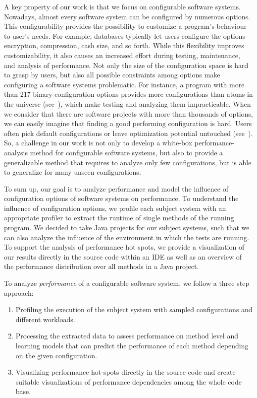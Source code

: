 A key property of our work is that we focus on configurable software systems. 
Nowadays, almost every software system can be configured by numerous options. 
This configurability provides the possibility to customize a program's behaviour to user's needs. 
For example, databases typically let users configure the options encryption, compression, cash size, and so forth. 
While this flexibility improves customizability, it also causes an increased effort during testing, maintenance, and analysis of performance. 
Not only the size of the configuration space is hard to grasp by users, but also all possible constraints among options make configuring a software systems problematic.
For instance, a program with more than 217 binary configuration options provides more configurations than atoms in the universe (see~\cite{krueger2006new}), which make testing and analyzing them impracticable. 
When we consider that there are software projects with more than thousands of options, we can easily imagine that finding a good performing configuration is hard.
Users often pick default configurations or leave optimization potential untouched (see~\cite{xu2015hey}).
So, a challenge in our work is not only to develop a white-box performance-analysis method for configurable software systems, but also to provide a generalizable method that requires to analyze only few configurations, but is able to generalize for many unseen configurations.

To sum up, our goal is to analyze performance and model the influence of configuration options of software systems on performance. 
To understand the influence of configuration options, we profile each subject system with an appropriate profiler to extract the runtime of single methods of the running program. 
We decided to take Java projects for our subject systems, such that we can also analyze the influence of the environment in which the tests are running. 
To support the analysis of performance hot spots, we provide a visualization of our results directly in the source code within an \ac{IDE} as well as an overview of the performance distribution over all methods in a Java project.


To analyze \textit{performance} of a configurable software system, we follow a three step approach:

\begin{enumerate}
	\item Profiling the execution of the subject system with sampled configurations and different workloads.
	\item Processing the extracted data to assess performance on method level and learning models that can predict the performance of each method depending on the given configuration.
	\item Visualizing performance hot-spots directly in the source code and create suitable visualizations of performance dependencies among the whole code base.
\end{enumerate}


